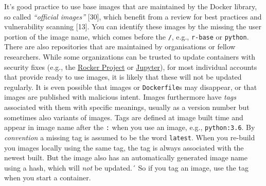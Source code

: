 \documentclass[10pt,letterpaper]{article}
\begin{document}
It's good practice to use base images that are maintained by the Docker
library, so called \emph{``official images''} {[}30{]}, which benefit
from a review for best practices and vulnerability scanning {[}13{]}.
You can identify these images by the missing the user portion of the
image name, which comes before the \texttt{/}, e.g., \texttt{r-base} or
\texttt{python}. There are also repositories that are maintained by
organisations or fellow researchers. While some organizations can be
trusted to update containers with security fixes (e.g., the
\href{https://hub.docker.com/u/rocker-org}{Rocker Project} or
\href{https://hub.docker.com/u/jupyter}{Jupyter}), for most individual
accounts that provide ready to use images, it is likely that these will
not be updated regularly. It is even possible that images or
\texttt{Dockerfile}s may disappear, or that images are published with
malicious intent. Images furthermore have \emph{tags} associated with
them with specific meanings, usually as a version number but sometimes
also variants of images. Tags are defined at image built time and appear
in image name after the \texttt{:} when you use an image, e.g.,
\texttt{python:3.6}. By \emph{convention} a missing tag is assumed to be
the word \texttt{latest}. When you re-build you images locally using the
same tag, the tag is always associated with the newest built. But the
image also has an automatically generated image name using a hash, which
will \emph{not} be updated.´ So if you tag an image, use the tag when
you start a container.
\end{document}
